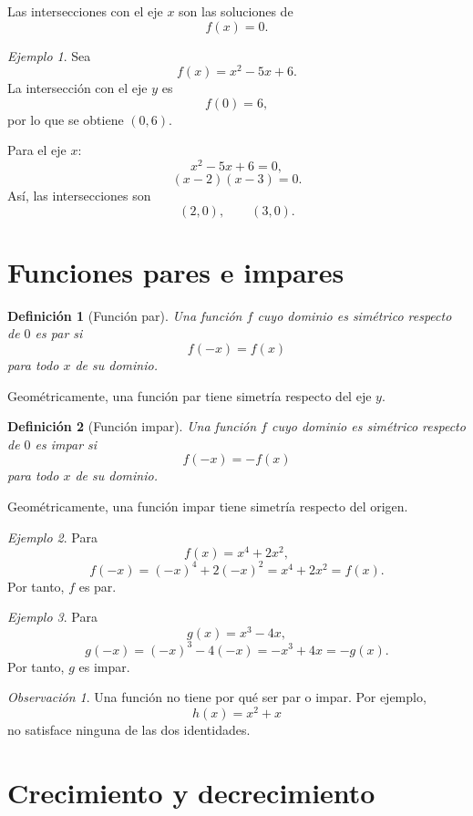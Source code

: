 \documentclass[12pt]{article}
\newtheorem{definicion}{Definición}[section]
\theoremstyle{remark}
\newtheorem{observacion}{Observación}[section]
\newtheorem{ejemplo}{Ejemplo}[section]
\begin{document}
Las intersecciones con el eje $x$ son las soluciones de
\[
f(x)=0.
\]

\begin{ejemplo}
Sea
\[
f(x)=x^2-5x+6.
\]
La intersección con el eje $y$ es
\[
f(0)=6,
\]
por lo que se obtiene $(0,6)$.

Para el eje $x$:
\[
x^2-5x+6=0,
\]
\[
(x-2)(x-3)=0.
\]
Así, las intersecciones son
\[
(2,0),\qquad(3,0).
\]
\end{ejemplo}

\section{Funciones pares e impares}

\begin{definicion}[Función par]
Una función $f$ cuyo dominio es simétrico respecto de $0$ es \emph{par} si
\[
f(-x)=f(x)
\]
para todo $x$ de su dominio.
\end{definicion}

Geométricamente, una función par tiene simetría respecto del eje $y$.

\begin{definicion}[Función impar]
Una función $f$ cuyo dominio es simétrico respecto de $0$ es \emph{impar} si
\[
f(-x)=-f(x)
\]
para todo $x$ de su dominio.
\end{definicion}

Geométricamente, una función impar tiene simetría respecto del origen.

\begin{ejemplo}
Para
\[
f(x)=x^4+2x^2,
\]
\[
f(-x)=(-x)^4+2(-x)^2=x^4+2x^2=f(x).
\]
Por tanto, $f$ es par.
\end{ejemplo}

\begin{ejemplo}
Para
\[
g(x)=x^3-4x,
\]
\[
g(-x)=(-x)^3-4(-x)=-x^3+4x=-g(x).
\]
Por tanto, $g$ es impar.
\end{ejemplo}

\begin{observacion}
Una función no tiene por qué ser par o impar. Por ejemplo,
\[
h(x)=x^2+x
\]
no satisface ninguna de las dos identidades.
\end{observacion}

\section{Crecimiento y decrecimiento}
\end{document}
